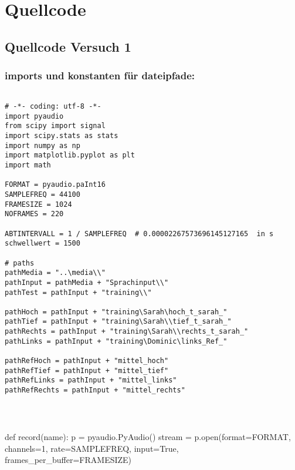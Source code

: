 \section{Quellcode}
\label{chap:APPENDIX_SOURCECODE}

\subsection{Quellcode Versuch 1}
\label{chap:APPENDIX_SOURCECODE_V1}

\subsubsection{imports und konstanten für dateipfade: }



\begin{verbatim}

# -*- coding: utf-8 -*-
import pyaudio
from scipy import signal
import scipy.stats as stats
import numpy as np
import matplotlib.pyplot as plt
import math

FORMAT = pyaudio.paInt16
SAMPLEFREQ = 44100
FRAMESIZE = 1024
NOFRAMES = 220

ABTINTERVALL = 1 / SAMPLEFREQ  # 0.00002267573696145127165  in s
schwellwert = 1500

# paths
pathMedia = "..\media\\"
pathInput = pathMedia + "Sprachinput\\"
pathTest = pathInput + "training\\"

pathHoch = pathInput + "training\Sarah\hoch_t_sarah_"
pathTief = pathInput + "training\Sarah\\tief_t_sarah_"
pathRechts = pathInput + "training\Sarah\\rechts_t_sarah_"
pathLinks = pathInput + "training\Dominic\links_Ref_"

pathRefHoch = pathInput + "mittel_hoch"
pathRefTief = pathInput + "mittel_tief"
pathRefLinks = pathInput + "mittel_links"
pathRefRechts = pathInput + "mittel_rechts"



\end{verbatim}

\begin{verbatim}

\end{verbatim}



def record(name):
    p = pyaudio.PyAudio()
    stream = p.open(format=FORMAT, channels=1, rate=SAMPLEFREQ, input=True, frames_per_buffer=FRAMESIZE)

